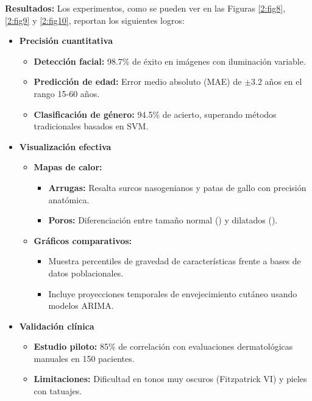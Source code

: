 \textbf{Resultados:}
Los experimentos, como se pueden ver en las Figuras \ref{2:fig8}, \ref{2:fig9} y \ref{2:fig10}, reportan los siguientes logros:


\begin{itemize}
    \item \textbf{Precisión cuantitativa}
	\begin{itemize}[label=$\bullet$, leftmargin=1em]
		\item \textbf{Detección facial:} 98.7\% de éxito en imágenes con iluminación variable.
		\item \textbf{Predicción de edad:} Error medio absoluto (MAE) de $\pm 3.2$ años en el rango 15-60 años.
		\item \textbf{Clasificación de género:} 94.5\% de acierto, superando métodos tradicionales basados en SVM.
	\end{itemize}

	\item \textbf{Visualización efectiva}
	\begin{itemize}[label=$\bullet$, leftmargin=1em]
		\item \textbf{Mapas de calor:}
		\begin{itemize}[label=$\circ$, leftmargin=1em]
			\item \textbf{Arrugas:} Resalta surcos nasogenianos y patas de gallo con precisión anatómica.
			\item \textbf{Poros:} Diferenciación entre tamaño normal (\<0.1mm) y dilatados (\>0.3mm).
		\end{itemize}
		\item \textbf{Gráficos comparativos:}
		\begin{itemize}[label=$\circ$, leftmargin=1em]
			\item Muestra percentiles de gravedad de características frente a bases de datos poblacionales.
			\item Incluye proyecciones temporales de envejecimiento cutáneo usando modelos ARIMA.
		\end{itemize}
	\end{itemize}


	\item \textbf{Validación clínica}
	\begin{itemize}[label=$\bullet$, leftmargin=1em]
		\item \textbf{Estudio piloto:} 85\% de correlación con evaluaciones dermatológicas manuales en 150 pacientes.
		\item \textbf{Limitaciones:} Dificultad en tonos muy oscuros (Fitzpatrick VI) y pieles con tatuajes.
	\end{itemize}

\end{itemize}

